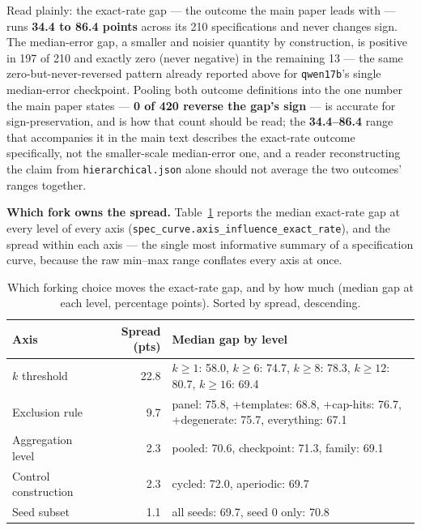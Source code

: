 \documentclass[11pt]{article}
\begin{document}
Read plainly: the exact-rate gap --- the outcome the main paper leads with ---
runs \textbf{34.4 to 86.4 points} across its 210 specifications and never
changes sign. The median-error gap, a smaller and noisier quantity by
construction, is positive in 197 of 210 and exactly zero (never negative) in
the remaining 13 --- the same zero-but-never-reversed pattern already reported
above for \texttt{qwen17b}'s single median-error checkpoint. Pooling both
outcome definitions into the one
number the main paper states --- \textbf{0 of 420 reverse the gap's sign} ---
is accurate for sign-preservation, and is how that count should be read; the
\textbf{34.4--86.4} range that accompanies it in the main text describes the
exact-rate outcome specifically, not the smaller-scale median-error one, and a
reader reconstructing the claim from \texttt{hierarchical.json} alone should
not average the two outcomes' ranges together.

\noindent\textbf{Which fork owns the spread.} Table~\ref{tab:hier-axis} reports
the median exact-rate gap at every level of every axis
(\texttt{spec\_curve.axis\_influence\_exact\_rate}), and the spread within each
axis --- the single most informative summary of a specification curve, because
the raw min--max range conflates every axis at once.

\begin{table}[h]
\centering
\caption{Which forking choice moves the exact-rate gap, and by how much
(median gap at each level, percentage points). Sorted by spread, descending.}
\label{tab:hier-axis}
\small
\begin{tabular}{@{}l r p{6.6cm}@{}}
\toprule
Axis & Spread (pts) & Median gap by level \\
\midrule
$k$ threshold & 22.8 & $k{\ge}1$: 58.0, $k{\ge}6$: 74.7, $k{\ge}8$: 78.3, $k{\ge}12$: 80.7, $k{\ge}16$: 69.4 \\
Exclusion rule & 9.7 & panel: 75.8, +templates: 68.8, +cap-hits: 76.7, +degenerate: 75.7, everything: 67.1 \\
Aggregation level & 2.3 & pooled: 70.6, checkpoint: 71.3, family: 69.1 \\
Control construction & 2.3 & cycled: 72.0, aperiodic: 69.7 \\
Seed subset & 1.1 & all seeds: 69.7, seed 0 only: 70.8 \\
\bottomrule
\end{tabular}
\end{table}
\end{document}
